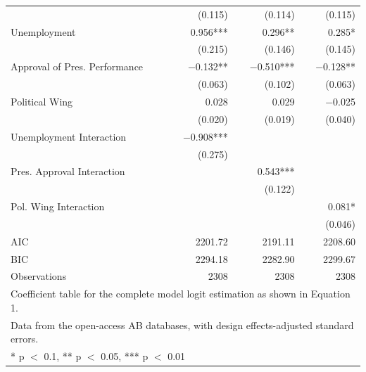 \documentclass[floatsintext,man]{apa7}\usepackage[]{graphicx}\usepackage[]{color}
\begin{document}
\begin{longtable}[t]{lrrr}
 & (\num{0.115}) & (\num{0.114}) & (\num{0.115})\\
Unemployment & \num{0.956}*** & \num{0.296}** & \num{0.285}*\\
 & (\num{0.215}) & (\num{0.146}) & (\num{0.145})\\
Approval of Pres. Performance & \num{-0.132}** & \num{-0.510}*** & \num{-0.128}**\\
 & (\num{0.063}) & (\num{0.102}) & (\num{0.063})\\
Political Wing & \num{0.028} & \num{0.029} & \num{-0.025}\\
 & (\num{0.020}) & (\num{0.019}) & (\num{0.040})\\
Unemployment Interaction & \num{-0.908}*** &  & \\
 & (\num{0.275}) &  & \\
Pres. Approval Interaction &  & \num{0.543}*** & \\
 &  & (\num{0.122}) & \\
Pol. Wing Interaction &  &  & \num{0.081}*\\
 &  &  & (\num{0.046})\\
\midrule
AIC & \num{2201.72} & \num{2191.11} & \num{2208.60}\\
BIC & \num{2294.18} & \num{2282.90} & \num{2299.67}\\
Observations & 2308 & 2308 & 2308\\
\bottomrule
\multicolumn{4}{l}{\rule{0pt}{1em}Coefficient table for the complete model logit estimation as shown in Equation 1.}\\
\multicolumn{4}{l}{\rule{0pt}{1em}Data from the open-access AB databases, with design effects-adjusted standard errors.}\\
\multicolumn{4}{l}{\rule{0pt}{1em}* p $<$ 0.1, ** p $<$ 0.05, *** p $<$ 0.01}\\
\end{longtable}
\end{document}
